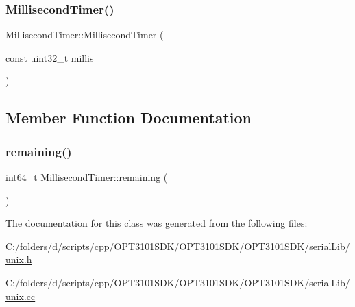 \subsubsection{\texorpdfstring{Millisecond\+Timer()}{MillisecondTimer()}}
{\footnotesize\ttfamily Millisecond\+Timer\+::\+Millisecond\+Timer (\begin{DoxyParamCaption}\item[{const uint32\+\_\+t}]{millis }\end{DoxyParamCaption})}



\subsection{Member Function Documentation}
\mbox{\label{classserial_1_1_millisecond_timer_a3786e2c6d8614adff0da39e1d1a2b0e3}} 
\subsubsection{\texorpdfstring{remaining()}{remaining()}}
{\footnotesize\ttfamily int64\+\_\+t Millisecond\+Timer\+::remaining (\begin{DoxyParamCaption}{ }\end{DoxyParamCaption})}



The documentation for this class was generated from the following files\+:\begin{DoxyCompactItemize}
\item 
C\+:/folders/d/scripts/cpp/\+O\+P\+T3101\+S\+D\+K/\+O\+P\+T3101\+S\+D\+K/\+O\+P\+T3101\+S\+D\+K/serial\+Lib/\mbox{\hyperlink{unix_8h}{unix.\+h}}\item 
C\+:/folders/d/scripts/cpp/\+O\+P\+T3101\+S\+D\+K/\+O\+P\+T3101\+S\+D\+K/\+O\+P\+T3101\+S\+D\+K/serial\+Lib/\mbox{\hyperlink{unix_8cc}{unix.\+cc}}\end{DoxyCompactItemize}
